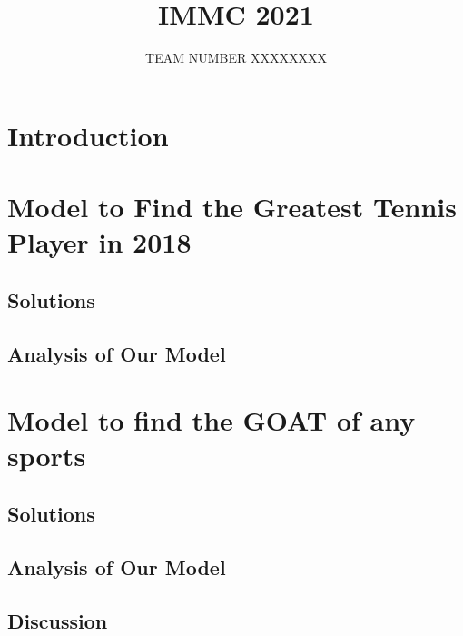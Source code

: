 \documentclass[12pt]{article}
\title{IMMC 2021}
\date{}
\author{TEAM NUMBER XXXXXXXX}
\begin{document}
\maketitle

% 

\newpage
\tableofcontents
\newpage



\section{Introduction} 


\newpage

\section{Model to Find the Greatest Tennis Player in 2018}
    \subsection{Solutions}
    
    
    \subsection{Analysis of Our Model}
    
    
\newpage

\section{Model to find the GOAT of any sports}
    \subsection{Solutions}
    
    
    \subsection{Analysis of Our Model}
    
    
    \subsection{Discussion}
    
    
\end{document}

